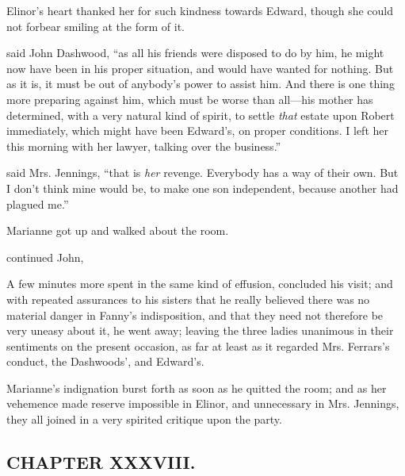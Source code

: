 Elinor's heart thanked her for such kindness towards Edward, though she could not forbear smiling at the form of it.

 said John Dashwood, “as all his friends were disposed to do by him, he might now have been in his proper situation, and would have wanted for nothing. But as it is, it must be out of anybody's power to assist him. And there is one thing more preparing against him, which must be worse than all---his mother has determined, with a very natural kind of spirit, to settle {\em that} estate upon Robert immediately, which might have been Edward's, on proper conditions. I left her this morning with her lawyer, talking over the business.”

 said Mrs. Jennings, “that is {\em her} revenge. Everybody has a way of their own. But I don't think mine would be, to make one son independent, because another had plagued me.”

Marianne got up and walked about the room.

 continued John, 

A few minutes more spent in the same kind of effusion, concluded his visit; and with repeated assurances to his sisters that he really believed there was no material danger in Fanny's indisposition, and that they need not therefore be very uneasy about it, he went away; leaving the three ladies unanimous in their sentiments on the present occasion, as far at least as it regarded Mrs. Ferrars's conduct, the Dashwoods', and Edward's.

Marianne's indignation burst forth as soon as he quitted the room; and as her vehemence made reserve impossible in Elinor, and unnecessary in Mrs. Jennings, they all joined in a very spirited critique upon the party.

\subsection[chapter-xxxviii.]{\useURL[url38][][][]\from[url38]CHAPTER XXXVIII.}

